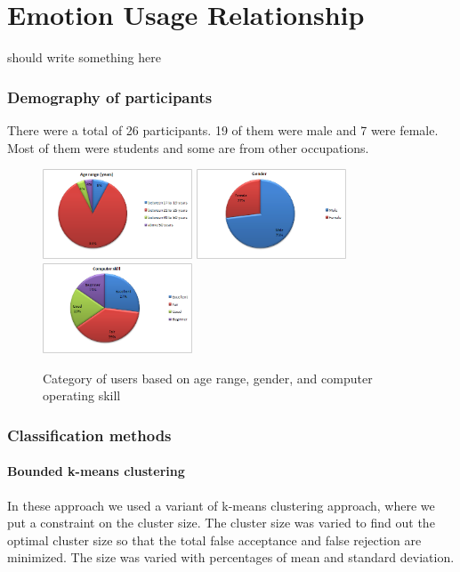 
\chapter{Emotion Usage Relationship}
should write something here




\subsection{Demography of participants}
There were a total of 26 participants. 19 of them were male and 7 were female. Most of them were students and some are from other occupations. 
\begin{figure}
\centering
\includegraphics[width=1.75in,clip,keepaspectratio]{Chapters/figures/ageChart3}
\includegraphics[width=1.75in,clip,keepaspectratio]{Chapters/figures/gender3}
\includegraphics[width=1.75in,clip,keepaspectratio]{Chapters/figures/skill}
\caption{Category of users based on age range, gender, and computer operating skill}
\label{Optional 3 }
\end{figure}




\subsection{Classification methods}
\subsubsection{Bounded k-means clustering}
In these approach we used a variant of k-means clustering approach, where we put a constraint on the cluster size. The cluster size was varied to find out the optimal cluster size so that the total false acceptance and false rejection are minimized. The size was varied with percentages of mean and standard deviation.

